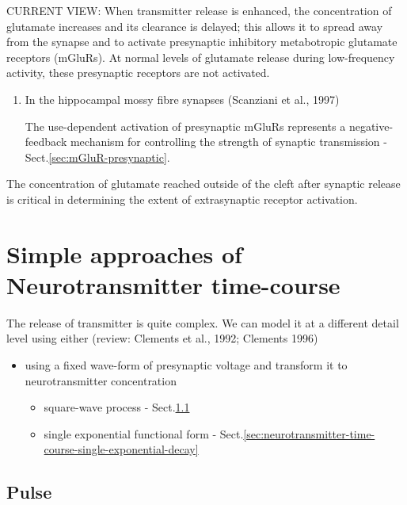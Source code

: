 CURRENT VIEW: When transmitter release is enhanced, the concentration of
glutamate increases and its clearance is delayed; this allows it to spread away
from the synapse and to activate presynaptic inhibitory metabotropic glutamate
receptors (mGluRs). At normal levels of glutamate release during low-frequency
activity, these presynaptic receptors are not activated.
\begin{enumerate}
  \item In the hippocampal mossy fibre synapses (Scanziani et al., 1997)
  
  The use-dependent activation of presynaptic mGluRs represents a
  negative-feedback mechanism for controlling the strength of synaptic
  transmission - Sect.\ref{sec:mGluR-presynaptic}.
  
  
\end{enumerate}

The concentration of glutamate reached outside of the cleft after synaptic
release is critical in determining the extent of extrasynaptic receptor
activation.



\section{Simple approaches of Neurotransmitter time-course}
\label{sec:neurotransmitter-time-course}

The  release  of transmitter is quite complex. We can model it at a different
detail level using either (review: Clements et al., 1992; Clements 1996)

\begin{itemize}
  \item using a fixed wave-form of presynaptic voltage and transform it to
  neurotransmitter concentration

\begin{itemize}
  \item square-wave process -
  Sect.\ref{sec:neurotransmitter-time-course-square-wave}
  
  \item single exponential functional form -
  Sect.\ref{sec:neurotransmitter-time-course-single-exponential-decay} 
  
\end{itemize}

\end{itemize}

\subsection{Pulse}
\label{sec:neurotransmitter-time-course-square-wave}

